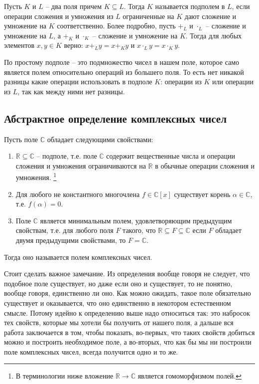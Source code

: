 \begin{definition}
[Подполе]
Пусть $K$ и $L$ -- два поля причем $K \subseteq L$.
Тогда $K$ называется подполем в $L$, если операции сложения и умножения из $L$ ограниченные на $K$ дают сложение и умножение на $K$ соответственно.
Более подробно, пусть $+_L$ и $\cdot_L$ -- сложение и умножение на $L$, а $+_K$ и $\cdot_K$ -- сложение и умножение на $K$.
Тогда для любых элементов $x,y\in K$ верно: $x +_L y = x+_K y$ и $x\cdot_L y = x \cdot_K y$.
\end{definition}

По простому подполе -- это подмножество чисел в нашем поле, которое само является полем относительно операций из большего поля.
То есть нет никакой разницы какие операции использовать в подполе $K$: операции из $K$ или операции из $L$, так как между ними нет разницы.

\subsection{Абстрактное определение комплексных чисел}

\begin{definition}
Пусть поле $\mathbb C$ обладает следующими свойствами:
\begin{enumerate}
\item $\mathbb R\subseteq\mathbb C$ -- подполе, т.е. поле $\mathbb C$ содержит вещественные числа и операции сложения и умножения ограничиваются на $\mathbb R$ в обычные операции сложения и умножения.%
\footnote{В терминологии ниже вложение $\mathbb R\to \mathbb C$ является гомоморфизмом полей.}

\item Для любого не константного многочлена $f\in\mathbb C[x]$ существует корень $\alpha\in \mathbb C$, т.е. $f(\alpha) = 0$.

\item Поле $\mathbb C$ является минимальным полем, удовлетворяющим предыдущим свойствам, т.е. для любого поля $F$ такого, что $\mathbb R\subseteq F\subseteq \mathbb C$ если $F$ обладает двумя предыдущими свойствами, то $F = \mathbb C$.
\end{enumerate}
Тогда оно называется полем комплексных чисел.
\end{definition}

Стоит сделать важное замечание.
Из определения вообще говоря не следует, что подобное поле существует, но даже если оно и существует, то не понятно, вообще говоря, единственно ли оно.
Как можно ожидать, такое поле обязательно существует и оказывается, что оно единственно в некотором естественном смысле.
Потому идейно к определению выше надо относиться так: это набросок тех свойств, которые мы хотели бы получить от нашего поля, а дальше вся работа заключается в том, чтобы показать, во-первых, что таких свойств добиться можно и построить необходимое поле, а во-вторых, что как бы мы ни построили поле комплексных чисел, всегда получится одно и то же.

